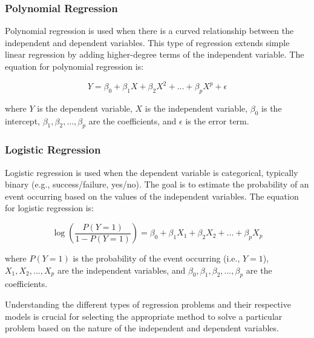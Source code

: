 \documentclass{beamer}
\begin{document}
\subsubsection{Polynomial Regression}

Polynomial regression is used when there is a curved relationship between the independent and dependent variables. This type of regression extends simple linear regression by adding higher-degree terms of the independent variable. The equation for polynomial regression is:

\begin{equation}
Y = \beta_0 + \beta_1X + \beta_2X^2 + ... + \beta_pX^p + \epsilon
\end{equation}

where $Y$ is the dependent variable, $X$ is the independent variable, $\beta_0$ is the intercept, $\beta_1, \beta_2, ..., \beta_p$ are the coefficients, and $\epsilon$ is the error term.

\subsubsection{Logistic Regression}

Logistic regression is used when the dependent variable is categorical, typically binary (e.g., success/failure, yes/no). The goal is to estimate the probability of an event occurring based on the values of the independent variables. The equation for logistic regression is:

\begin{equation}
\log\left(\frac{P(Y=1)}{1-P(Y=1)}\right) = \beta_0 + \beta_1X_1 + \beta_2X_2 + ... + \beta_pX_p
\end{equation}

where $P(Y=1)$ is the probability of the event occurring (i.e., $Y=1$), $X_1, X_2, ..., X_p$ are the independent variables, and $\beta_0, \beta_1, \beta_2, ..., \beta_p$ are the coefficients.

Understanding the different types of regression problems and their respective models is crucial for selecting the appropriate method to solve a particular problem based on the nature of the independent and dependent variables.
\end{document}
